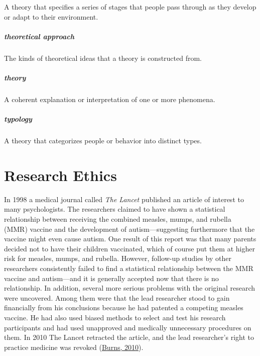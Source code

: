 \documentclass[
]{krantz}
\begin{document}
A theory that specifies a series of stages that people pass through as they develop or adapt to their environment.

\hypertarget{theoretical-approach-1}{%
\paragraph*{theoretical approach}\label{theoretical-approach-1}}

The kinds of theoretical ideas that a theory is constructed from.

\hypertarget{theory}{%
\paragraph*{theory}\label{theory}}

A coherent explanation or interpretation of one or more phenomena.

\hypertarget{typology}{%
\paragraph*{typology}\label{typology}}

A theory that categorizes people or behavior into distinct types.

\hypertarget{research-ethics}{%
\chapter{Research Ethics}\label{research-ethics}}

In 1998 a medical journal called \emph{The Lancet} published an article of interest to many psychologists. The researchers claimed to have shown a statistical relationship between receiving the combined measles, mumps, and rubella (MMR) vaccine and the development of autism---suggesting furthermore that the vaccine might even cause autism. One result of this report was that many parents decided not to have their children vaccinated, which of course put them at higher risk for measles, mumps, and rubella. However, follow-up studies by other researchers consistently failed to find a statistical relationship between the MMR vaccine and autism---and it is generally accepted now that there is no relationship. In addition, several more serious problems with the original research were uncovered. Among them were that the lead researcher stood to gain financially from his conclusions because he had patented a competing measles vaccine. He had also used biased methods to select and test his research participants and had used unapproved and medically unnecessary procedures on them. In 2010 The Lancet retracted the article, and the lead researcher's right to practice medicine was revoked (\protect\hyperlink{ref-burns2010british}{Burns, 2010}).
\end{document}
